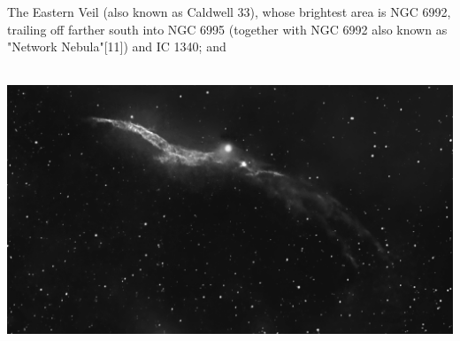 {\footnotesize\color{white}
The Eastern Veil (also known as Caldwell 33), whose brightest area is NGC 6992, trailing off farther south into NGC 6995 (together with NGC 6992 also known as "Network Nebula"[11]) and IC 1340; and


}\ \\
\includegraphics[width=\textwidth]{../Imaging//Grayscale/Western_Veil_Nebula.jpg}

